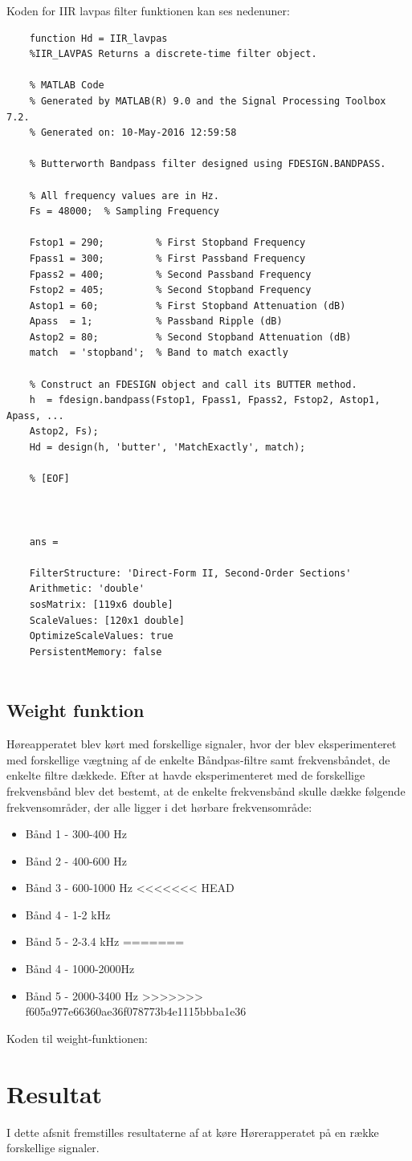 Koden for IIR lavpas filter funktionen kan ses nedenuner:
\begin{verbatim}
	function Hd = IIR_lavpas
	%IIR_LAVPAS Returns a discrete-time filter object.
	
	% MATLAB Code
	% Generated by MATLAB(R) 9.0 and the Signal Processing Toolbox 7.2.
	% Generated on: 10-May-2016 12:59:58
	
	% Butterworth Bandpass filter designed using FDESIGN.BANDPASS.
	
	% All frequency values are in Hz.
	Fs = 48000;  % Sampling Frequency
	
	Fstop1 = 290;         % First Stopband Frequency
	Fpass1 = 300;         % First Passband Frequency
	Fpass2 = 400;         % Second Passband Frequency
	Fstop2 = 405;         % Second Stopband Frequency
	Astop1 = 60;          % First Stopband Attenuation (dB)
	Apass  = 1;           % Passband Ripple (dB)
	Astop2 = 80;          % Second Stopband Attenuation (dB)
	match  = 'stopband';  % Band to match exactly
	
	% Construct an FDESIGN object and call its BUTTER method.
	h  = fdesign.bandpass(Fstop1, Fpass1, Fpass2, Fstop2, Astop1, Apass, ...
	Astop2, Fs);
	Hd = design(h, 'butter', 'MatchExactly', match);
	
	% [EOF]
	
	
	
	ans =
	
	FilterStructure: 'Direct-Form II, Second-Order Sections'
	Arithmetic: 'double'                               
	sosMatrix: [119x6 double]                         
	ScaleValues: [120x1 double]                         
	OptimizeScaleValues: true                                   
	PersistentMemory: false
	
\end{verbatim}

\subsection{Weight funktion}

Høreapperatet blev kørt med forskellige signaler, hvor der blev eksperimenteret med forskellige vægtning af de enkelte Båndpas-filtre samt frekvensbåndet, de enkelte filtre dækkede. Efter at havde eksperimenteret med de forskellige frekvensbånd blev det bestemt, at de enkelte frekvensbånd skulle dække følgende frekvensområder, der alle ligger i det hørbare frekvensområde:
\begin{itemize}
	\item Bånd 1 - 300-400 Hz
	\item Bånd 2 - 400-600 Hz
	\item Bånd 3 - 600-1000 Hz
<<<<<<< HEAD
	\item Bånd 4 - 1-2 kHz
	\item Bånd 5 - 2-3.4 kHz
=======
	\item Bånd 4 - 1000-2000Hz
	\item Bånd 5 - 2000-3400 Hz
>>>>>>> f605a977e66360ae36f078773b4e1115bbba1e36
\end{itemize}

Koden til weight-funktionen:


\section{Resultat}
I dette afsnit fremstilles resultaterne af at køre Hørerapperatet på en række forskellige signaler.
